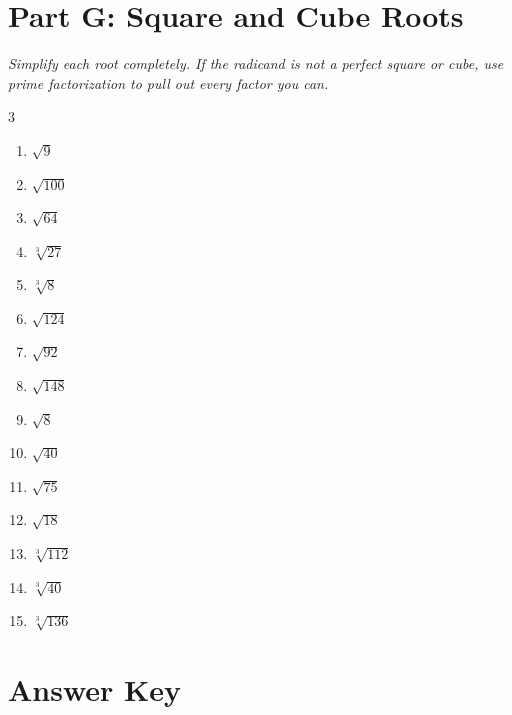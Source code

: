 \documentclass[11pt]{article}
\begin{document}
\section*{Part G: Square and Cube Roots}
\noindent\textit{Simplify each root completely. If the radicand is not a perfect square or cube, use prime factorization to pull out every factor you can.}
\begin{multicols}{3}
\begin{enumerate}
  \item $\sqrt{9}$
  \vspace{1.6cm}
  \item $\sqrt{100}$
  \vspace{1.6cm}
  \item $\sqrt{64}$
  \vspace{1.6cm}
  \item $\sqrt[3]{27}$
  \vspace{1.6cm}
  \item $\sqrt[3]{8}$
  \vspace{1.6cm}
  \item $\sqrt{124}$
  \vspace{1.6cm}
  \item $\sqrt{92}$
  \vspace{1.6cm}
  \item $\sqrt{148}$
  \vspace{1.6cm}
  \item $\sqrt{8}$
  \vspace{1.6cm}
  \item $\sqrt{40}$
  \vspace{1.6cm}
  \item $\sqrt{75}$
  \vspace{1.6cm}
  \item $\sqrt{18}$
  \vspace{1.6cm}
  \item $\sqrt[3]{112}$
  \vspace{1.6cm}
  \item $\sqrt[3]{40}$
  \vspace{1.6cm}
  \item $\sqrt[3]{136}$
  \vspace{1.6cm}
\end{enumerate}
\end{multicols}

\newpage
{}
\section*{Answer Key}
\end{document}
